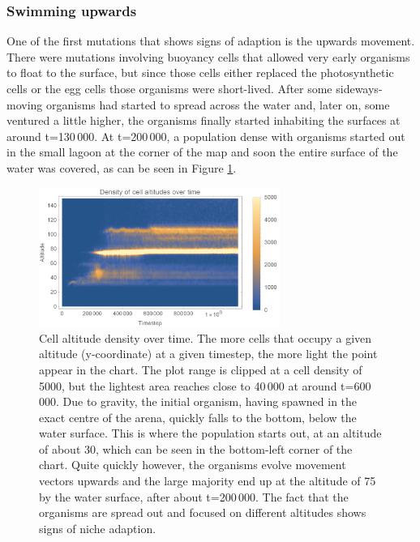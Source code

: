 \subsubsection{Swimming upwards}
One of the first mutations that shows signs of adaption is the upwards movement. There were mutations involving buoyancy cells that allowed very early organisms to float to the surface, but since those cells either replaced the photosynthetic cells or the egg cells those organisms were short-lived. After some sideways-moving organisms had started to spread across the water and, later on, some ventured a little higher, the organisms finally started inhabiting the surfaces at around t=130\,000. At t=200\,000, a population dense with organisms started out in the small lagoon at the corner of the map and soon the entire surface of the water was covered, as can be seen in Figure \ref{fig:altidudeDensity}.
\begin{figure}
  \begin{center}
  \includegraphics[width=0.7\textwidth]{figure/altitudeDensity}
  \caption{
    Cell altitude density over time. The more cells that occupy a given altitude (y-coordinate) at a given timestep, the more light the point appear in the chart. The plot range is clipped at a cell density of 5000, but the lightest area reaches close to 40\,000 at around t=600\,000. Due to gravity, the initial organism, having spawned in the exact centre of the arena, quickly falls to the bottom, below the water surface. This is where the population starts out, at an altitude of about 30, which can be seen in the bottom-left corner of the chart. Quite quickly however, the organisms evolve movement vectors upwards and the large majority end up at the altitude of 75 by the water surface, after about t=200\,000.
    The fact that the organisms are spread out and focused on different altitudes shows signs of niche adaption.
  }
  \label{fig:altidudeDensity}
  \end{center}
\end{figure}

